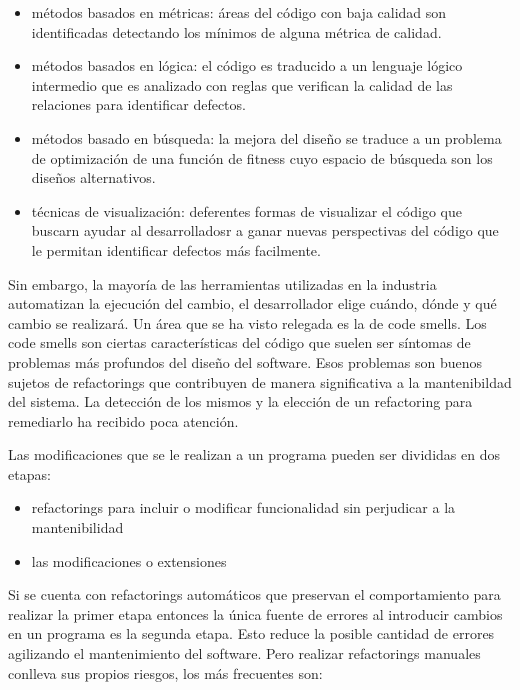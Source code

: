 \begin{itemize}
    \item métodos basados en métricas: áreas del código con baja calidad son identificadas detectando
    los mínimos de alguna métrica de calidad.
    \item métodos basados en lógica: el código es traducido a un lenguaje lógico intermedio que es analizado
    con reglas que verifican la calidad de las relaciones para identificar defectos.
    \item métodos basado en búsqueda: la mejora del diseño se traduce a un problema de optimización de una función de 
    fitness cuyo espacio de búsqueda son los diseños alternativos.
    \item técnicas de visualización: deferentes formas de visualizar el código que buscarn ayudar al
    desarrolladosr a ganar nuevas perspectivas del código que le permitan identificar defectos más
    facilmente.
\end{itemize}

Sin embargo, la mayoría de las herramientas utilizadas en la industria automatizan la ejecución del
cambio, el desarrollador elige cuándo, dónde y qué cambio se realizará.
Un área que se ha visto relegada es la de code smells. Los code smells son ciertas características
del código que suelen ser síntomas de problemas más profundos del diseño del software. Esos problemas
son buenos sujetos de refactorings que contribuyen de manera significativa a la mantenibildad del
sistema. La detección de los mismos y la elección de un refactoring para remediarlo ha recibido
poca atención.

Las modificaciones que se le realizan a un programa pueden ser divididas en dos etapas:

\begin{itemize}
    \item refactorings para incluir o modificar funcionalidad sin perjudicar a la mantenibilidad
    \item las modificaciones o extensiones
\end{itemize}

Si se cuenta con refactorings automáticos que preservan el comportamiento para realizar la primer
etapa entonces la única fuente de errores al introducir cambios en un programa es la segunda etapa.
Esto reduce la posible cantidad de errores agilizando el mantenimiento del software. Pero realizar
refactorings manuales conlleva sus propios riesgos, los más frecuentes son:

